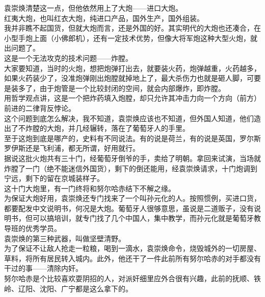 \begin{multicols}{\theparacolNo}
袁崇焕清楚这一点，但他依然用上了大炮——进口大炮。\\

红夷大炮，也叫红衣大炮，纯进口产品，国外生产，国外组装。\\

我并非瞧不起国货，但就大炮而言，还是外国的好。其实明代的大炮也还凑合，在小型手炮上面（小佛郎机），还有一定技术优势，但像大将军炮这种大型火炮，就出问题了。\\

这是一个无法攻克的技术问题——炸膛。\\

大家要知道，当时的火炮，想把炮弹打出去，就要装火药，炮弹越重，火药越多，如果火药装少了，没准炮弹刚出炮膛就掉地上了，最大杀伤力也就是砸人脚，可要是装多了，由于炮管是一个比较封闭的空间，就会内部爆炸，即炸膛。\\

用哲学观点讲，这是一个把炸药填入炮膛，却只允许其冲击力向一个方向（前方）前进的二律背反悖论。\\

这个问题到底怎么解决，我不知道，袁崇焕应该也不知道，但外国人知道，他们造出了不炸膛的大炮，并几经辗转，落在了葡萄牙人的手里。\\

至于这炮到底是哪产的，史料有不同说法。有的说是荷兰，有的说是英国，罗尔斯罗伊斯还是飞利浦，都无所谓，好用就行。\\

据说这批火炮共有三十门，经葡萄牙倒爷的手，卖给了明朝。拿回来试演，当场就炸膛了一门（绝不能迷信外国货），剩下的倒还能用，经袁崇焕请求，十门炮调到宁远，剩下的留在京城装样子。\\

这十门大炮里，有一门终将和努尔哈赤结下不解之缘。\\

为保证大炮好用，袁崇焕还专门找来了一个叫孙元化的人。按照惯例，买进口货，都要配发中文说明书，何况是大炮。葡萄牙人很够意思，虽说是二道贩子，没有说明书，但可以搞培训，就专门找了几个中国人，集中教学，而孙元化就是葡萄牙教导班的优秀学员。\\

袁崇焕的第三种武器，叫做坚壁清野。\\

为了保证不让敌人抢走一粒粮，喝到一滴水，袁崇焕命令，烧毁城外的一切房屋、草料，将所有居民转入城内。此外，他还干了一件此前所有努尔哈赤的对手都没有干过的事——清除内奸。\\

努尔哈赤是个比较喜欢耍阴招的人，对派奸细里应外合很有兴趣，此前的抚顺、铁岭、辽阳、沈阳、广宁都是这么拿下的。\\


\end{multicols}
